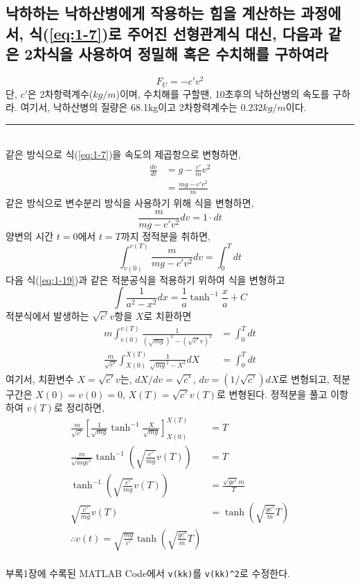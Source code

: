 \documentclass{article}
\numberwithin{equation}{section}
\theoremstyle{examplestyle}
\begin{document}
\subsection{낙하하는 낙하산병에게 작용하는 힘을 계산하는 과정에서, 식(\ref{eq:1-7})로 주어진 선형관계식 대신, 다음과 같은 2차식을 사용하여 정밀해 혹은 수치해를 구하여라}

\begin{displaymath}
F_{U}=-c'v^2
\end{displaymath}
단, $c'$은 2차항력계수($kg/m$)이며, 수치해를 구할땐, 10초후의 낙하산병의 속도를 구하라. 여기서, 낙하산병의 질량은 68.1kg이고 2차항력계수는 $0.232kg/m$이다.\\
\rule{\textwidth}{0.1pt}
\\
같은 방식으로 식(\ref{eq:1-7})을 속도의 제곱항으로 변형하면,
\begin{align}
\frac{dv}{dt}&=g-\frac{c'}{m}v^2\\
&=\frac{mg-c'v^2}{m}
\end{align}
같은 방식으로 변수분리 방식을 사용하기 위해 식을 변형하면,
\begin{equation}
\frac{m}{mg-c'v^2}dv=1\cdot dt
\end{equation}
양변의 시간 $t=0$에서 $t=T$까지 정적분을 취하면,
\begin{equation}
\int_{v(0)}^{v(T)}\frac{m}{mg-c'v^2}dv=\int_{0}^{T}dt
\end{equation}
다음 식(\ref{eq:1-19})과 같은 적분공식을 적용하기 위하여 식을 변형하고
\begin{equation}
\int\frac{1}{a^2-x^2}dx=\frac{1}{a}\tanh^{-1}\frac{x}{a}+C
\label{eq:1-19}
\end{equation}
적분식에서 발생하는 $\sqrt{c'}v$항을 $X$로 치환하면
\begin{align}
m\int_{v(0)}^{v(T)}\frac{1}{(\sqrt{mg})^2-(\sqrt{c'}v)^2}&=\int_{0}^{T}dt\\
\frac{m}{\sqrt{c'}}\int_{X(0)}^{X(T)}\frac{1}{\sqrt{mg}^2-X^2}dX&=\int_{0}^{T}dt
\end{align}
여기서, 치환변수 $X=\sqrt{c'}v$는, $dX/dv=\sqrt{c'}$, $dv=(1/\sqrt{c'})dX$로 변형되고, 적분구간은 $X(0)=v(0)=0$, $X(T)=\sqrt{c'}v(T)$로 변형된다. 정적분을 풀고 이항하여 $v(T)$로 정리하면,
\begin{align}
\frac{m}{\sqrt{c'}}\left[\frac{1}{\sqrt{mg}}\tanh^{-1}\frac{X}{\sqrt{mg}}\right]_{X(0)}^{X(T)}&=T\\
\frac{m}{\sqrt{mgc'}}\tanh^{-1}\left(\sqrt{\frac{c'}{mg}}v(T)\right)&=T\\
\tanh^{-1}\left(\sqrt{\frac{c'}{mg}}v(T)\right)&=\frac{\sqrt{gc'}{m}}T\\
\sqrt{\frac{c'}{mg}}v(T)&=\tanh\left(\sqrt{\frac{gc'}{m}}T\right)\\
\therefore v(t)=\sqrt{\frac{mg}{c'}}\tanh\left(\sqrt{\frac{gc'}{m}}T\right)
\end{align}
\\
부록1장에 수록된 MATLAB Code에서 \texttt{v(kk)}를 \texttt{v(kk)\^{}2}로 수정한다.

\end{document}
